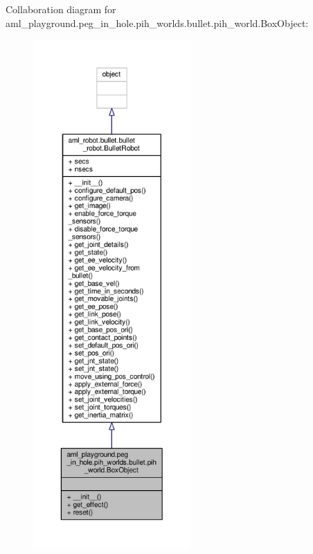 Collaboration diagram for aml\-\_\-playground.\-peg\-\_\-in\-\_\-hole.\-pih\-\_\-worlds.\-bullet.\-pih\-\_\-world.\-Box\-Object\-:
\nopagebreak
\begin{figure}[H]
\begin{center}
\leavevmode
\includegraphics[height=550pt]{classaml__playground_1_1peg__in__hole_1_1pih__worlds_1_1bullet_1_1pih__world_1_1_box_object__coll__graph}
\end{center}
\end{figure}
